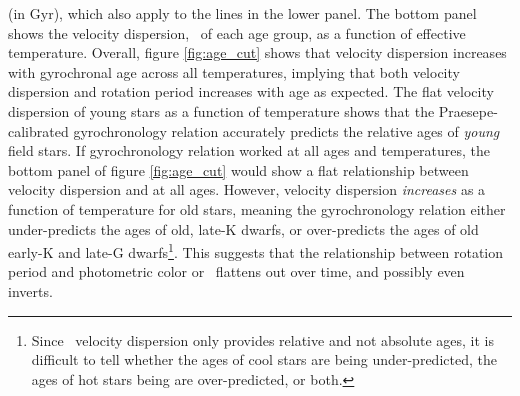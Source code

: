 (in Gyr), which also apply to the lines in the lower panel.
The bottom panel shows the velocity dispersion, \sigmavb\ of each age group,
as a function of effective temperature.
Overall, figure \ref{fig:age_cut} shows that velocity dispersion increases
with gyrochronal age across all temperatures, implying that both velocity
dispersion and rotation period increases with age as expected.
The flat velocity dispersion of young stars as a function of temperature
shows that the Praesepe-calibrated gyrochronology relation accurately predicts
the relative ages of {\it young} field stars.
If \citet{angus2019} gyrochronology relation worked at all ages and
temperatures, the bottom panel of figure \ref{fig:age_cut} would show a flat
relationship between velocity dispersion and \teff at all ages.
However, velocity dispersion {\it increases} as a function of temperature for
old stars, meaning the \citet{angus2019} gyrochronology relation either
under-predicts the ages of old, late-K dwarfs, or over-predicts the ages of
old early-K and late-G dwarfs\footnote{Since \vb\ velocity dispersion only
provides relative and not absolute ages, it is difficult to tell whether the
ages of cool stars are being under-predicted, the ages of hot stars being are
over-predicted, or both.}.
This suggests that the relationship between rotation period and photometric
color or \teff\ flattens out over time, and possibly even inverts.

